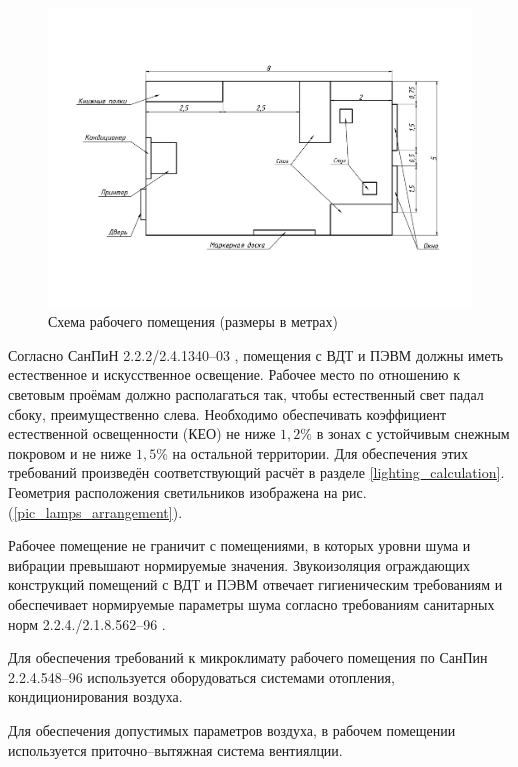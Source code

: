 \begin{figure}[ht!]
    \centering
    \includegraphics[width=\textwidth, keepaspectratio, clip=true, trim=0mm 35mm 0mm 35mm]
                    {./src/ecology/pictures/workroom_scheme}
    \caption{Схема рабочего помещения (размеры в метрах)}
    \label{pic_workroom_scheme}
\end{figure}

Согласно СанПиН 2.2.2/2.4.1340--03 \cite{ecology_sanpin_1340_03}, помещения с ВДТ
и ПЭВМ должны иметь естественное и искусственное освещение. Рабочее место по
отношению к световым проёмам должно располагаться так, чтобы естественный свет
падал сбоку, преимущественно слева. Необходимо обеспечивать коэффициент
естественной освещенности (КЕО) не ниже $1,2 \%$ в зонах с устойчивым снежным
покровом и не ниже $1,5 \%$ на остальной территории.
Для обеспечения этих требований произведён соответствующий расчёт в разделе
\ref{lighting_calculation}. Геометрия расположения светильников изображена на рис.
(\ref{pic_lamps_arrangement}).

Рабочее помещение не граничит с помещениями, в которых уровни шума и вибрации превышают
нормируемые значения. Звукоизоляция ограждающих конструкций помещений с ВДТ и ПЭВМ
отвечает гигиеническим требованиям и обеспечивает нормируемые параметры шума
согласно требованиям санитарных норм 2.2.4./2.1.8.562--96 \cite{ecology_sanitary_norm_562_96}.

Для обеспечения требований к микроклимату рабочего помещения по СанПин 2.2.4.548--96
\cite{ecology_sanpin_548_96} используется оборудоваться системами отопления,
кондиционирования воздуха.

Для обеспечения допустимых параметров воздуха, в рабочем помещении используется
приточно--вытяжная система вентиялции.

